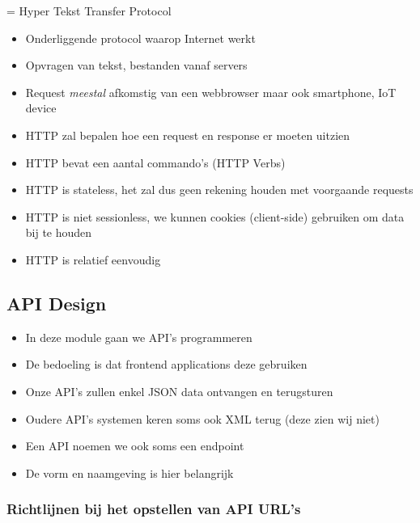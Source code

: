 \documentclass{article}
\begin{document}
= Hyper Tekst Transfer Protocol

\begin{itemize}
    \item Onderliggende protocol waarop Internet werkt
    \item Opvragen van tekst, bestanden vanaf servers
    \item Request \textit{meestal} afkomstig van een webbrowser maar ook smartphone, IoT device
    \item HTTP zal bepalen hoe een request en response er moeten uitzien
    \item HTTP bevat een aantal commando’s (HTTP Verbs)
    \item HTTP is stateless, het zal dus geen rekening houden met voorgaande requests
    \item HTTP is niet sessionless, we kunnen cookies (client-side) gebruiken om data bij te houden
    \item HTTP is relatief eenvoudig
\end{itemize}

\subsection{API Design}

\begin{itemize}
    \item In deze module gaan we API's programmeren
    \item De bedoeling is dat frontend applications deze gebruiken
    \item Onze API's zullen enkel JSON data ontvangen en terugsturen
    \item Oudere API's systemen keren soms ook XML terug (deze zien wij niet)
    \item Een API noemen we ook soms een endpoint
    \item De vorm en naamgeving is hier belangrijk
\end{itemize}

\subsubsection{Richtlijnen bij het opstellen van API URL's}
\end{document}
